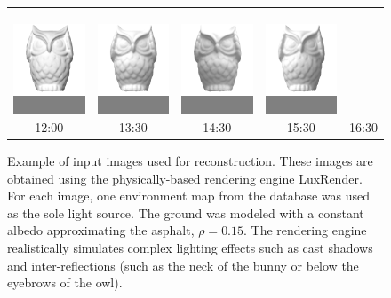 \begin{figure}
\begin{tabular}{ccccc}
\colorbox{Gray}{\includegraphics[height=3cm]{recons/owl-input-02.png}} &
\colorbox{Gray}{\includegraphics[height=3cm]{recons/owl-input-03.png}} &
\colorbox{Gray}{\includegraphics[height=3cm]{recons/owl-input-04.png}} &
\colorbox{Gray}{\includegraphics[height=3cm]{recons/owl-input-05.png}} \\
12:00 & 13:30 & 14:30 & 15:30 & 16:30
\end{tabular}
\vspace{.5em}
\caption{\small Example of input images used for reconstruction. These images are obtained using the physically-based rendering engine LuxRender. For each image, one environment map from the database was used as the sole light source. The ground was modeled with a constant albedo approximating the asphalt, $\rho = 0.15$. The rendering engine realistically simulates complex lighting effects such as cast shadows and inter-reflections (such as the neck of the bunny or below the eyebrows of the owl). }
\label{fig:luxrender-input}
\end{figure}


